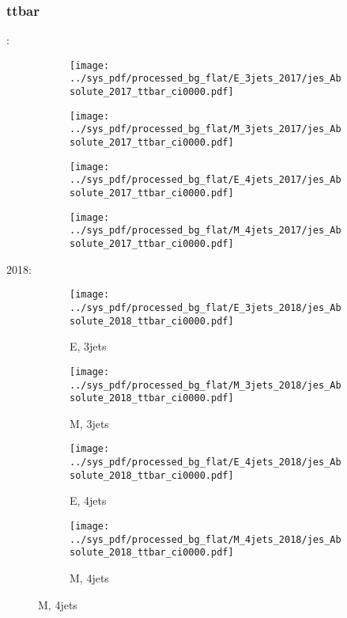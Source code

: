 \documentclass{beamer}
\begin{document}
\begin{frame}
\frametitle{ttbar}
\fontsize{5}{1}:
\begin{figure}
\centering
\begin{subfigure}[b]{0.24\textwidth}
\texttt{[image: ../sys\_pdf/processed\_bg\_flat/E\_3jets\_2017/jes\_Absolute\_2017\_ttbar\_ci0000.pdf]}
\end{subfigure}
\begin{subfigure}[b]{0.24\textwidth}
\texttt{[image: ../sys\_pdf/processed\_bg\_flat/M\_3jets\_2017/jes\_Absolute\_2017\_ttbar\_ci0000.pdf]}
\end{subfigure}
\begin{subfigure}[b]{0.24\textwidth}
\texttt{[image: ../sys\_pdf/processed\_bg\_flat/E\_4jets\_2017/jes\_Absolute\_2017\_ttbar\_ci0000.pdf]}
\end{subfigure}
\begin{subfigure}[b]{0.24\textwidth}
\texttt{[image: ../sys\_pdf/processed\_bg\_flat/M\_4jets\_2017/jes\_Absolute\_2017\_ttbar\_ci0000.pdf]}
\end{subfigure}
\end{figure}
2018:
\begin{figure}
\centering
\begin{subfigure}[b]{0.24\textwidth}
\texttt{[image: ../sys\_pdf/processed\_bg\_flat/E\_3jets\_2018/jes\_Absolute\_2018\_ttbar\_ci0000.pdf]}
\captionsetup{font=tiny}
\caption{E, 3jets}
\end{subfigure}
\begin{subfigure}[b]{0.24\textwidth}
\texttt{[image: ../sys\_pdf/processed\_bg\_flat/M\_3jets\_2018/jes\_Absolute\_2018\_ttbar\_ci0000.pdf]}
\captionsetup{font=tiny}
\caption{M, 3jets}
\end{subfigure}
\begin{subfigure}[b]{0.24\textwidth}
\texttt{[image: ../sys\_pdf/processed\_bg\_flat/E\_4jets\_2018/jes\_Absolute\_2018\_ttbar\_ci0000.pdf]}
\captionsetup{font=tiny}
\caption{E, 4jets}
\end{subfigure}
\begin{subfigure}[b]{0.24\textwidth}
\texttt{[image: ../sys\_pdf/processed\_bg\_flat/M\_4jets\_2018/jes\_Absolute\_2018\_ttbar\_ci0000.pdf]}
\captionsetup{font=tiny}
\caption{M, 4jets}
\end{subfigure}
\end{figure}
\end{frame}
\end{document}
